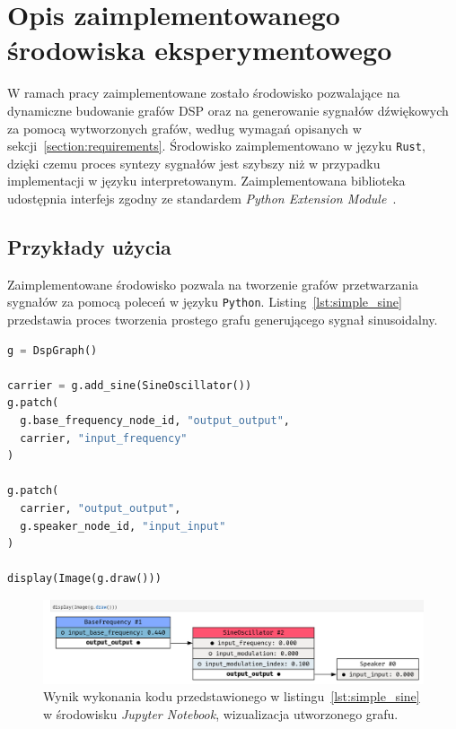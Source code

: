 \section{Opis zaimplementowanego środowiska eksperymentowego}

W ramach pracy zaimplementowane zostało środowisko pozwalające na dynamiczne budowanie grafów DSP oraz
na generowanie sygnałów dźwiękowych za pomocą wytworzonych grafów,
według wymagań opisanych w sekcji~\ref{section:requirements}. Środowisko zaimplementowano w języku \texttt{Rust},
dzięki czemu proces syntezy sygnałów jest szybszy niż w przypadku implementacji w języku interpretowanym.
Zaimplementowana biblioteka udostępnia interfejs zgodny ze standardem
\textit{Python Extension Module}~\cite{python_extension_module}.

\subsection{Przykłady użycia}

Zaimplementowane środowisko pozwala na tworzenie grafów przetwarzania sygnałów za pomocą poleceń w języku \texttt{Python}.
Listing~\ref{lst:simple_sine} przedstawia proces tworzenia prostego grafu generującego sygnał sinusoidalny.

\begin{lstlisting}[language=python, caption=Utworzenie prostego grafu generującego sygnał sinusoidalny., label={lst:simple_sine}]
g = DspGraph()

carrier = g.add_sine(SineOscillator())
g.patch(
  g.base_frequency_node_id, "output_output",
  carrier, "input_frequency"
)

g.patch(
  carrier, "output_output",
  g.speaker_node_id, "input_input"
)

display(Image(g.draw()))
\end{lstlisting}

\begin{figure}[H]
    \centering
    \includegraphics[width=1.0\linewidth]{rys02/simple_graph_creation_example.png}
    \caption{
      Wynik wykonania kodu przedstawionego w listingu~\ref{lst:simple_sine} w środowisku \textit{Jupyter Notebook},
      wizualizacja utworzonego grafu.
    }
    \label{fig:example_graph_creation_jupyter}
\end{figure}


